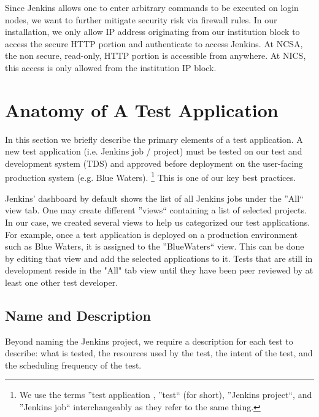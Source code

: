 \documentclass[AMA]{WileyNJD-v1}
\begin{document}
Since Jenkins allows one to enter arbitrary commands to be executed on login nodes, we want to further mitigate security risk via firewall rules. 
In our installation, we only allow IP address originating from our institution block to access the secure HTTP portion and authenticate to access Jenkins. 
At NCSA, the non secure, read-only, HTTP portion is accessible from anywhere. 
At NICS, this access is only allowed from the institution IP block. 


\section{Anatomy of A Test Application}
\label{sec:TestAnatomy}
In this section we briefly describe the primary elements of a test application. 
A new test application (i.e. Jenkins job / project) must be tested on our test and development system (TDS) and approved before deployment on the user-facing production system (e.g. Blue Waters). 
\footnote{We use the terms ''test application , ''test`` (for short), ''Jenkins project``, and ''Jenkins job`` interchangeably as they refer to the same thing.}
This is one of our key best practices. 

Jenkins' dashboard by default shows the list of all Jenkins jobs under the ''All`` view tab. 
One may create different ''views`` containing a list of selected projects. 
In our case, we created several views to help us categorized our test applications.
For example, once a test application is deployed on a production environment such as Blue Waters, it is assigned to the ''BlueWaters`` view. 
This can be done by editing that view and add the selected applications to it.
Tests that are still in development reside in the "All" tab view until they have been peer reviewed by at least one other test developer.

\subsection{Name and Description}
Beyond naming the Jenkins project, we require a description for each test to describe: what is tested, the resources used by the test, the intent of the test, and the scheduling frequency of the test.
\end{document}
